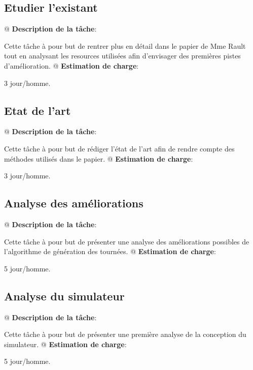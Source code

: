 \documentclass[noposter,final]{polytech/polytech}
\begin{document}
		\subsection{Etudier l’existant}
			\begin{easylist}
				@ \textbf{Description de la tâche}:
				
				Cette tâche à pour but de rentrer plus en détail dans le papier de Mme Rault tout en analysant les resources utilisées afin d'envisager des premières pistes d'amélioration.
				@ \textbf{Estimation de charge}:
				
				3 jour/homme.
			\end{easylist}
			
		\subsection{Etat de l'art}
			\begin{easylist}
				@ \textbf{Description de la tâche}:
				
				Cette tâche à pour but de rédiger l'état de l'art afin de rendre compte des méthodes utilisés dans le papier.
				@ \textbf{Estimation de charge}:
				
				3 jour/homme.
			\end{easylist}
			
		\subsection{Analyse des améliorations}
			\begin{easylist}
				@ \textbf{Description de la tâche}:
				
				Cette tâche à pour but de présenter une analyse des améliorations possibles de l'algorithme de génération des tournées.
				@ \textbf{Estimation de charge}:
				
				5 jour/homme.
			\end{easylist}
			
		\subsection{Analyse du simulateur}
			\begin{easylist}
				@ \textbf{Description de la tâche}:
				
				Cette tâche à pour but de présenter une première analyse de la conception du simulateur.
				@ \textbf{Estimation de charge}:
				
				5 jour/homme.
			\end{easylist}
			
\end{document}
